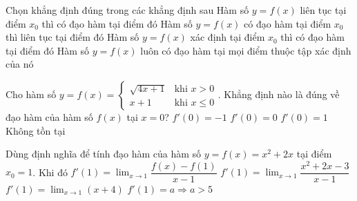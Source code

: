 \begin{ex}%
	Chọn  khẳng định đúng trong các khẳng định sau
	\choice 
		{Hàm số $y=f(x)$ liên tục tại điểm $x_0$ thì có  đạo hàm tại điểm đó}
		{\True Hàm số $y=f(x)$ có đạo hàm tại điểm  $x_0$ thì liên tục tại điểm đó}
		{Hàm số $y=f(x)$ xác định tại điểm $x_0$ thì có đạo hàm  tại điểm đó}
		{Hàm số $y=f(x)$ luôn có đạo hàm tại mọi điểm thuộc tập  xác định của nó}
\end{ex}

\begin{ex}%
	Cho hàm số $ y=f(x)= \begin{cases} \sqrt{4x+1} & \text{khi } x>0 \\ x+1 & \text{khi } x \leq 0
\end{cases}$. Khẳng định nào là đúng về đạo hàm của hàm số $f(x)$ tại $x=0$?
 \choice
	{$f'(0)  = - 1$}
	 {$f'(0) = 0$}
	{$f'(0) = 1$} 
	{\True  Không tồn tại}
\end{ex}



\begin{ex}%
 Dùng định nghĩa để tính đạo hàm  của hàm số $y=f(x)=x^2+2x$ tại điểm $x_0=1$. Khi đó
 \choiceTF 
  {\True $f'(1)=\displaystyle\lim_{x \to  1}\dfrac{f(x)-f(1)}{x-1}$}
  {\True $f'(1)=\displaystyle\lim_{x  \to 1}\dfrac{x^2+2x-3}{x-1}$}
   {$f'(1)=\displaystyle\lim_{x\to 1}\left( x+4\right)$ }
  {$f'(1)=a \Rightarrow  a>5$}
\end{ex}


